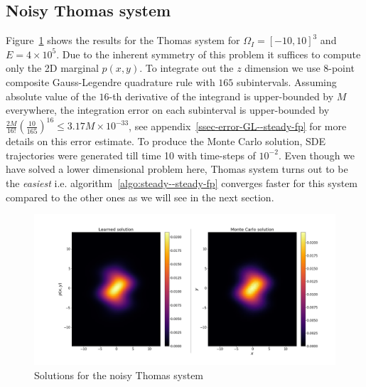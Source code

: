 \subsection{Noisy Thomas system}
Figure~\ref{fig:Thomas-steady--steady-fp} shows the results for the Thomas system for $\Omega_I = [-10, 10]^3$ and $E=4\times10^5$. Due to the inherent symmetry of this problem it suffices to compute only the 2D marginal $p(x, y)$. To integrate out the $z$ dimension we use 8-point composite Gauss-Legendre quadrature rule with $165$ subintervals. Assuming absolute value of the $16$-th derivative of the integrand is upper-bounded by $M$ everywhere, the integration error on each subinterval is upper-bounded by $\frac{2M}{16!}\left(\frac{10}{165}\right)^{16}\le3.17M\times10^{-33}$, see appendix~\ref{ssec-error-GL--steady-fp} for more details on this error estimate. To produce the Monte Carlo solution, SDE trajectories were generated till time 10 with time-steps of $10^{-2}$. Even though we have solved a lower dimensional problem here, Thomas system turns out to be the \textit{easiest} i.e. algorithm~\ref{algo:steady--steady-fp} converges faster for this system compared to the other ones as we will see in the next section.
\begin{figure}[!htp]
    \centering\includegraphics[scale=0.32]{steady-fp/plots/steady-plots-Thomas-steady.png}
    \caption{Solutions for the noisy Thomas system}
    \label{fig:Thomas-steady--steady-fp}
\end{figure}
